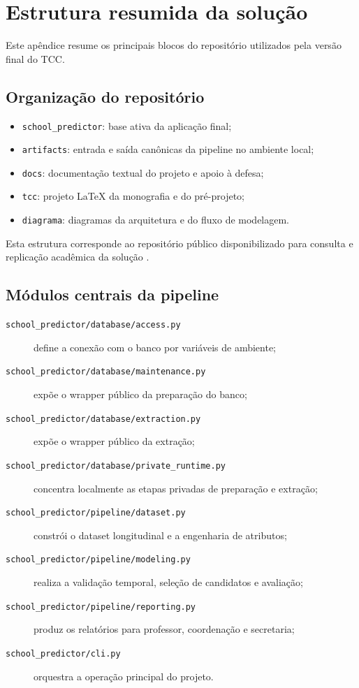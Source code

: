 \chapter{Estrutura resumida da solu\c{c}\~ao}
\label{apend:estrutura}

Este ap\^endice resume os principais blocos do reposit\'orio utilizados pela vers\~ao final do TCC.

\section{Organiza\c{c}\~ao do reposit\'orio}

\begin{itemize}
    \item \texttt{school\_predictor}: base ativa da aplica\c{c}\~ao final;
    \item \texttt{artifacts}: entrada e sa\'ida can\^onicas da pipeline no ambiente local;
    \item \texttt{docs}: documenta\c{c}\~ao textual do projeto e apoio \`a defesa;
    \item \texttt{tcc}: projeto LaTeX da monografia e do pr\'e-projeto;
    \item \texttt{diagrama}: diagramas da arquitetura e do fluxo de modelagem.
\end{itemize}

Esta estrutura corresponde ao reposit\'orio p\'ublico disponibilizado para consulta e replica\c{c}\~ao acad\^emica da solu\c{c}\~ao \cite{schoolpredictorgithub}.

\section{M\'odulos centrais da pipeline}

\begin{description}
    \item[\texttt{school\_predictor/database/access.py}] define a conex\~ao com o banco por vari\'aveis de ambiente;
    \item[\texttt{school\_predictor/database/maintenance.py}] exp\~oe o wrapper p\'ublico da prepara\c{c}\~ao do banco;
    \item[\texttt{school\_predictor/database/extraction.py}] exp\~oe o wrapper p\'ublico da extra\c{c}\~ao;
    \item[\texttt{school\_predictor/database/private\_runtime.py}] concentra localmente as etapas privadas de prepara\c{c}\~ao e extra\c{c}\~ao;
    \item[\texttt{school\_predictor/pipeline/dataset.py}] constr\'oi o dataset longitudinal e a engenharia de atributos;
    \item[\texttt{school\_predictor/pipeline/modeling.py}] realiza a valida\c{c}\~ao temporal, sele\c{c}\~ao de candidatos e avalia\c{c}\~ao;
    \item[\texttt{school\_predictor/pipeline/reporting.py}] produz os relat\'orios para professor, coordena\c{c}\~ao e secretaria;
    \item[\texttt{school\_predictor/cli.py}] orquestra a opera\c{c}\~ao principal do projeto.
\end{description}

